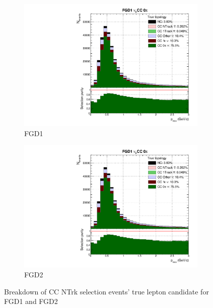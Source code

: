 \begin{figure}[!h]
	\begin{subfigure}[t]{0.49\textwidth}
		\includegraphics[width=\textwidth,page=16, trim={0mm 0mm 0mm 9mm}, clip]{figures/mach3/selection/2017b_Diag_WithSelection}
		\caption{FGD1}
	\end{subfigure}
	\begin{subfigure}[t]{0.49\textwidth}
		\includegraphics[width=\textwidth,page=20, trim={0mm 0mm 0mm 9mm}, clip]{figures/mach3/selection/2017b_Diag_WithSelection}
		\caption{FGD2}
	\end{subfigure}
	\caption{Breakdown of \numubar CC NTrk selection events' true lepton candidate for FGD1 and FGD2 }
	\label{fig:ccnubarNtrk_muon}
\end{figure}

